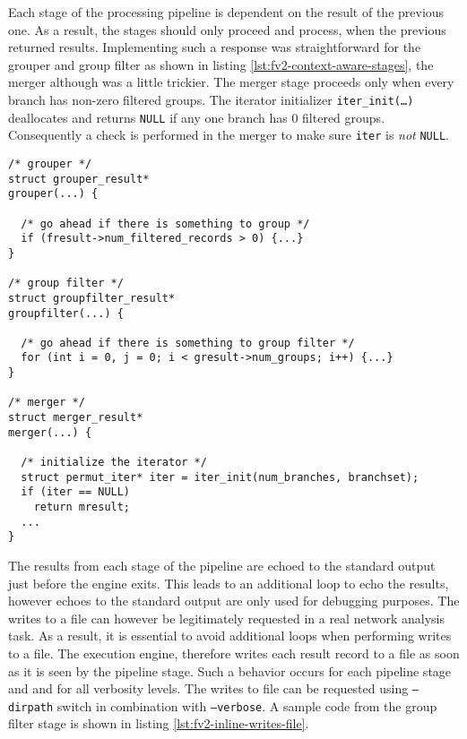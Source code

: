 Each stage of the processing pipeline is dependent on the result of the
previous one. As a result, the stages should only proceed and process, when
the previous returned results. Implementing such a response was
straightforward  for the grouper and
group filter as shown in listing \ref{lst:fv2-context-aware-stages}, the
merger although was a little trickier.  The merger stage proceeds only when
every branch has non-zero filtered groups.  The iterator initializer
\texttt{iter\_init(\ldots)} deallocates and returns \texttt{NULL} if any one
branch has $0$ filtered groups.  Consequently a check is performed in the
merger to make sure \texttt{iter} is \emph{not} \texttt{NULL}.

\begin{lstlisting}
/* grouper */
struct grouper_result*
grouper(...) {

  /* go ahead if there is something to group */
  if (fresult->num_filtered_records > 0) {...}
}

/* group filter */
struct groupfilter_result*
groupfilter(...) {

  /* go ahead if there is something to group filter */
  for (int i = 0, j = 0; i < gresult->num_groups; i++) {...}
}

/* merger */
struct merger_result*
merger(...) {

  /* initialize the iterator */
  struct permut_iter* iter = iter_init(num_branches, branchset);
  if (iter == NULL)
    return mresult;
  ...
}
\end{lstlisting}

The results from each stage of the pipeline are echoed to the standard output
just before the engine exits. This leads to an additional loop to echo the
results, however echoes to the standard output are only used for debugging
purposes.  The writes to a file can however
be legitimately requested in a real network analysis task. As a result, it is
essential to avoid additional loops when performing writes to a file. The
execution engine, therefore writes each result record to a file as soon as it
is seen by the pipeline stage. Such a behavior occurs for each pipeline stage
and and for all verbosity levels. The writes to file can be requested using
\texttt{--dirpath} switch in combination with \texttt{--verbose}. A sample
code from the group filter stage is shown in listing
\ref{lst:fv2-inline-writes-file}.

